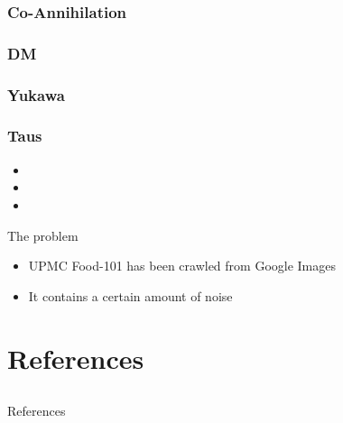 \documentclass[compress,xcolor=table]{beamer}
\begin{document}
\subsubsection{Co-Annihilation}
\subsubsection{DM}
\subsubsection{Yukawa}
\subsubsection{Taus}
\begin{frame}{}
	
	\begin{exampleblock}{}
		\begin{itemize}
			\item
			
			\item
			
			\item
			
		\end{itemize}
		
	\end{exampleblock}

	\begin{alertblock}{The problem}
	
	\begin{itemize}
		\item
		UPMC Food-101 has been crawled from Google Images
		\item
		It contains a certain amount of noise
	\end{itemize}
	
	\end{alertblock}
	
\end{frame}
\section{References} \subsection{}
\begin{frame}[allowframebreaks]{References}
	
	\printbibliography[heading=none]
	
\end{frame}
\end{document}
